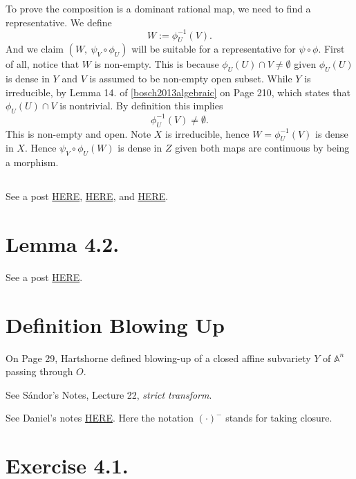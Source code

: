 To prove the composition is a dominant rational map, we need to find a representative. 
We define 
\[W:=\phi_U^{-1}(V).\] 
And we claim $(W,~\psi_V\circ\phi_U)$ will be suitable for a representative for $\psi\circ\phi$.
First of all, notice that $W$ is non-empty. This is because $\phi_U(U)\cap V\neq \emptyset$ given $\phi_U(U)$ is dense in $Y$ and $V$ is assumed to be non-empty open subset. While $Y$ is irreducible, by Lemma 14. of \ref{bosch2013algebraic} on Page 210, which states that $\phi_U(U)\cap V$ is nontrivial. By definition this implies 
\[\phi_U^{-1}(V)\neq \emptyset.\] This is non-empty and open. Note $X$ is irreducible, hence $W=\phi_U^{-1}(V)$ is dense in $X$. Hence $\psi_V\circ\phi_U (W)$ is dense in $Z$ given both maps are continuous by being a morphism.

\subsection{}

See a post \href{https://math.stackexchange.com/questions/1191794/composition-of-dominant-rational-maps}{HERE}, \href{https://people.maths.bris.ac.uk/~malab/PDFs/Algebraic%20Geometry%20L3.pdf}{HERE}, and \href{https://math.stackexchange.com/questions/431578/questions-about-the-composition-of-two-dominant-rational-maps}{HERE}.


\section{Lemma 4.2.}

See a post \href{https://math.stackexchange.com/questions/4552630/hartshorne-algebraic-geometry-proof-of-lemma-4-2-chapter-i-section-4-on-ratio}{HERE}.

\section{Definition Blowing Up}

On Page 29, Hartshorne defined blowing-up of a closed affine subvariety $Y$ of $\mathbb A^n$ passing through $O$.

See S\'andor's Notes, Lecture 22, \textit{strict transform}.

See Daniel's notes \href{http://therisingsea.org/notes/hartshorne1-4.pdf}{HERE}. Here the notation $(\cdot)^{-}$ stands for taking closure.

\section{Exercise 4.1.}\label{Chapter 1, Ex. 4.1.}

